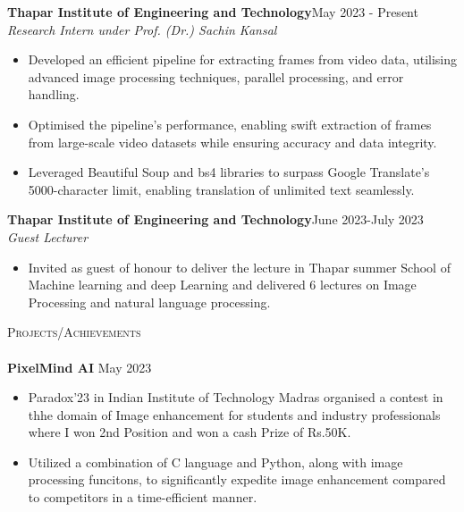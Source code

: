 \documentclass[a4paper]{article}
\newcommand{\lineunder} {
    \vspace*{-8pt} \\
    \hspace*{-18pt} \hrulefill \\
}
\newcommand{\header} [1] {
    {\hspace*{-18pt}\vspace*{6pt} \textsc{#1}}
    \vspace*{-6pt} \lineunder
}
\begin{document}
\vspace{-2mm}
{\textbf{Thapar Institute of Engineering and Technology}}\hfill May 2023 - Present \\
 {\textit{Research Intern under Prof. (Dr.) Sachin Kansal }}  \
\vspace{-2mm}
\begin{itemize} 
\item Developed an efficient pipeline for extracting frames from video data, utilising advanced image processing techniques, parallel processing, and error handling. 
\vspace{-2mm}
\item Optimised the pipeline's performance, enabling swift extraction of frames from large-scale video datasets while ensuring accuracy and data integrity.
\vspace{-2mm}
\item Leveraged Beautiful Soup and bs4 libraries to surpass Google Translate's 5000-character limit, enabling translation of unlimited text seamlessly.
\end{itemize}
\vspace{-2mm}
{\textbf{Thapar Institute of Engineering and Technology}}\hfill June 2023-July 2023 \\
 {\textit{Guest Lecturer}}  \
\vspace{-2mm}
\begin{itemize} 
\item Invited as guest of  honour to deliver the lecture in Thapar summer School of Machine learning and deep Learning and delivered 6 lectures on Image Processing and natural language processing.
\end{itemize}
\vspace{-1.5mm}
\header{Projects/Achievements}
{\textbf{PixelMind AI}} \hfill May 2023 \\
\vspace{-3mm}
\begin{itemize} 
	\item Paradox’23 in Indian Institute of Technology Madras organised a contest in thhe domain of Image enhancement for students and industry professionals where I won 2nd Position and won a cash Prize of Rs.50K.
    \vspace{-2mm}
    \item Utilized a combination of C language and Python, along with image processing funcitons, to significantly expedite image enhancement compared to competitors in a time-efficient manner.
\end{itemize}
\end{document}
